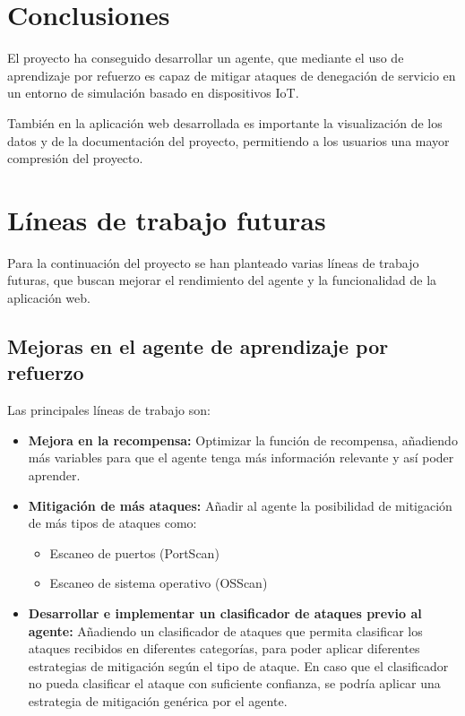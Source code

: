 
\section{Conclusiones}
El proyecto ha conseguido desarrollar un agente, que mediante el uso de aprendizaje por refuerzo es capaz de mitigar ataques de denegación de servicio en un entorno de simulación basado en dispositivos IoT.

También en la aplicación web desarrollada es importante la visualización de los datos y de la documentación del proyecto, permitiendo a los usuarios una mayor compresión del proyecto.

\section{Líneas de trabajo futuras}
Para la continuación del proyecto se han planteado varias líneas de trabajo futuras, que buscan mejorar el rendimiento del agente y la funcionalidad de la aplicación web. 

\subsection{Mejoras en el agente de aprendizaje por refuerzo}
Las principales líneas de trabajo son:
\begin{itemize}
    \item \textbf{Mejora en la recompensa:} Optimizar la función de recompensa, añadiendo más variables para que el agente tenga más información relevante y así poder aprender.
    \item \textbf{Mitigación de más ataques:} Añadir al agente la posibilidad de mitigación de más tipos de ataques como:
    \begin{itemize}
        \item Escaneo de puertos (PortScan)
        \item Escaneo de sistema operativo (OSScan)
    \end{itemize}
    \item \textbf{Desarrollar e implementar un clasificador de ataques previo al agente:} Añadiendo un clasificador de ataques que permita clasificar los ataques recibidos en diferentes categorías, para poder aplicar diferentes estrategias de mitigación según el tipo de ataque. En caso que el clasificador no pueda clasificar el ataque con suficiente confianza, se podría aplicar una estrategia de mitigación genérica por el agente.
\end{itemize}

